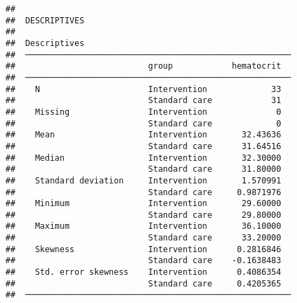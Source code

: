 \documentclass[
]{memoir}
\newenvironment{Shaded}{\begin{snugshade}}{\end{snugshade}}
\newcommand{\AttributeTok}[1]{\textcolor[rgb]{0.77,0.63,0.00}{#1}}
\newcommand{\CommentTok}[1]{\textcolor[rgb]{0.56,0.35,0.01}{\textit{#1}}}
\newcommand{\DecValTok}[1]{\textcolor[rgb]{0.00,0.00,0.81}{#1}}
\newcommand{\FunctionTok}[1]{\textcolor[rgb]{0.00,0.00,0.00}{#1}}
\newcommand{\NormalTok}[1]{#1}
\newcommand{\OtherTok}[1]{\textcolor[rgb]{0.56,0.35,0.01}{#1}}
\newcommand{\SpecialCharTok}[1]{\textcolor[rgb]{0.00,0.00,0.00}{#1}}
\newcommand{\StringTok}[1]{\textcolor[rgb]{0.31,0.60,0.02}{#1}}
\begin{document}
\begin{verbatim}
## 
##  DESCRIPTIVES
## 
##  Descriptives                                           
##  ────────────────────────────────────────────────────── 
##                           group            hematocrit   
##  ────────────────────────────────────────────────────── 
##    N                      Intervention             33   
##                           Standard care            31   
##    Missing                Intervention              0   
##                           Standard care             0   
##    Mean                   Intervention       32.43636   
##                           Standard care      31.64516   
##    Median                 Intervention       32.30000   
##                           Standard care      31.80000   
##    Standard deviation     Intervention       1.570991   
##                           Standard care     0.9871976   
##    Minimum                Intervention       29.60000   
##                           Standard care      29.80000   
##    Maximum                Intervention       36.10000   
##                           Standard care      33.20000   
##    Skewness               Intervention      0.2816846   
##                           Standard care    -0.1638483   
##    Std. error skewness    Intervention      0.4086354   
##                           Standard care     0.4205365   
##  ──────────────────────────────────────────────────────
\end{verbatim}

\begin{Shaded}
\end{Shaded}
\end{document}
